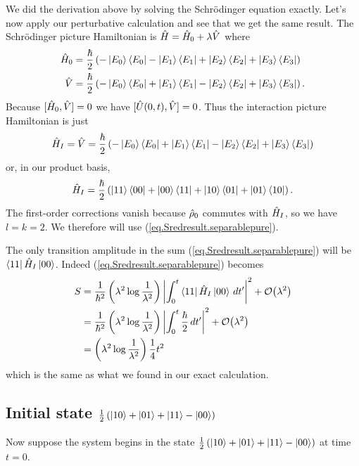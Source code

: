 We did the derivation above by solving the Schr\"odinger equation exactly. Let's now apply our perturbative calculation and see that we get the same result. The Schr\"odinger picture Hamiltonian is \(\hat{H} = \hat{H}_0 + \lambda \hat{V}\) where
\begin{align*}
\hat{H}_0 &= \frac{\hbar}{2} \left(-\left|E_0\right\rangle\left\langle E_0\right| - \left|E_1\right\rangle\left\langle E_1\right| + \left|E_2\right\rangle\left\langle E_2\right| + \left|E_3\right\rangle\left\langle E_3\right|\right) \\
\hat{V} &= \frac{\hbar}{2} \left(-\left|E_0\right\rangle\left\langle E_0\right| + \left|E_1\right\rangle\left\langle E_1\right| - \left|E_2\right\rangle\left\langle E_2\right| + \left|E_3\right\rangle\left\langle E_3\right|\right).
\end{align*}
Because \([\hat{H}_0, \hat{V}] = 0\) we have \([\hat{U}(0, t), \hat{V}] = 0\). Thus the interaction picture Hamiltonian is just
\[\hat{H}_I = \hat{V} = \frac{\hbar}{2} \left(-\left|E_0\right\rangle\left\langle E_0\right| + \left|E_1\right\rangle\left\langle E_1\right| - \left|E_2\right\rangle\left\langle E_2\right| + \left|E_3\right\rangle\left\langle E_3\right|\right)\]
or, in our product basis,
\[
\hat{H}_I = \frac{\hbar}{2} \left(\left|11\right\rangle\left\langle00\right| + \left|00\right\rangle\left\langle11\right| + \left|10\right\rangle\left\langle01\right| + \left|01\right\rangle\left\langle10\right|\right).
\]
The first-order corrections vanish because \(\hat{\rho}_0\) commutes with \(\hat{H}_I\), so we have \(l=k=2\). We therefore will use (\ref{eq.Sredresult.separablepure}).

The only transition amplitude in the sum (\ref{eq.Sredresult.separablepure}) will be \(\left\langle11\right| \hat{H}_I \left|00\right\rangle\). Indeed (\ref{eq.Sredresult.separablepure}) becomes
\begin{align*}
S &= \frac{1}{\hbar^2} \left(\lambda^2 \log \frac{1}{\lambda^2}\right) \left|\int_0^t \left\langle11\right| \hat{H}_I \left|00\right\rangle\,dt^\prime\right|^2 + \mathcal{O}{\left(\lambda^2\right)} \\
&= \frac{1}{\hbar^2} \left(\lambda^2 \log \frac{1}{\lambda^2}\right) \left|\int_0^t \frac{\hbar}{2}\,dt^\prime\right|^2 + \mathcal{O}{\left(\lambda^2\right)} \\
&= \left(\lambda^2 \log \frac{1}{\lambda^2}\right) \frac{1}{4} t^2
\end{align*}
which is the same as what we found in our exact calculation.

\subsection{Initial state \(\frac{1}{2}\left(\left|10\right\rangle + \left|01\right\rangle + \left|11\right\rangle - \left|00\right\rangle\right)\)}

Now suppose the system begins in the state \(\frac{1}{2}\left(\left|10\right\rangle + \left|01\right\rangle + \left|11\right\rangle - \left|00\right\rangle\right)\) at time \(t=0\).

